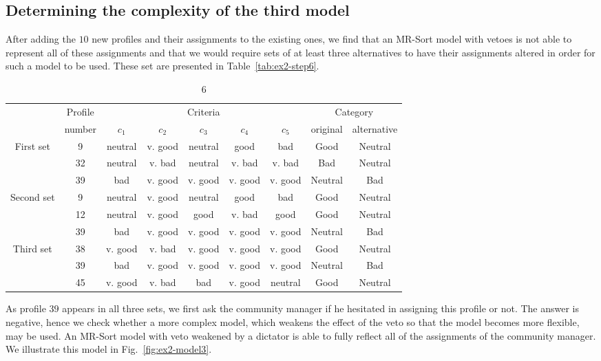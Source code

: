 \subsection{Determining the complexity of the third model}

After adding the $10$ new profiles and their assignments to the existing ones, we find that an MR-Sort model with vetoes is not able to represent all of these assignments and that we would require sets of at least three alternatives to have their assignments altered in order for such a model to be used. These set are presented in Table~\ref{tab:ex2-step6}.

\begin{table}
\caption{6}\label{tab:ex-phase1-step6}
\small

\begin{tabular}{ccccccc|cc}
&Profile& \multicolumn{5}{c}{Criteria} & \multicolumn{2}{|c}{Category} \\
&number& $c_1$ & $c_2$ & $c_3$ & $c_4$ & $c_5$ & \multicolumn{1}{c}{original} & \multicolumn{1}{c}{alternative} \\\hline
\multirow{1}{*}{First set}&9 &neutral & v. good & neutral &    good &     bad &  Good & Neutral \\
&32& neutral & v. bad & neutral & v. bad & v. bad & Bad & Neutral \\
&39 & bad & v. good & v. good & v. good & v. good & Neutral & Bad \\\hline

\multirow{1}{*}{Second set}&9 &neutral & v. good & neutral &    good &     bad &  Good & Neutral \\
&12&neutral & v. good &    good &  v. bad &    good & Good & Neutral \\
&39 & bad & v. good & v. good & v. good & v. good & Neutral & Bad \\\hline
         
\multirow{1}{*}{Third set}&38 & v. good & v. bad & v. good & v. good & v. good &  Good & Neutral \\
&39 & bad & v. good & v. good & v. good & v. good & Neutral & Bad \\
&45 & v. good & v. bad & bad & v. good & neutral & Good & Neutral \\\hline
\end{tabular}
\end{table}

As profile $39$ appears in all three sets, we first ask the community manager if he hesitated in assigning this profile or not. The answer is negative, hence we check whether a more complex model, which weakens the effect of the veto so that the model becomes more flexible, may be used. An MR-Sort model with veto weakened by a dictator is able to fully reflect all of the assignments of the community manager. We illustrate this model in Fig.~\ref{fig:ex2-model3}.

